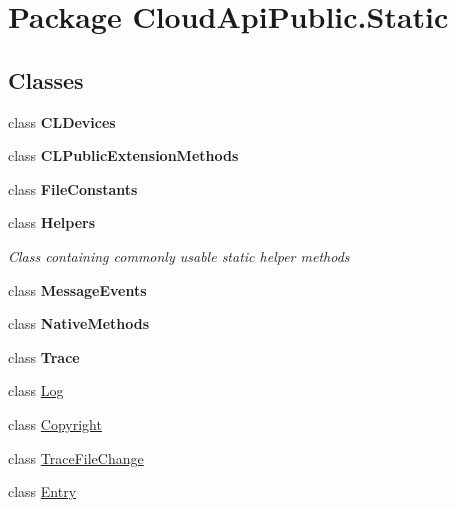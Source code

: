 \hypertarget{namespace_cloud_api_public_1_1_static}{\section{Package Cloud\-Api\-Public.\-Static}
\label{namespace_cloud_api_public_1_1_static}
}
\subsection*{Classes}
\begin{DoxyCompactItemize}
\item 
class {\bfseries C\-L\-Devices}
\item 
class {\bfseries C\-L\-Public\-Extension\-Methods}
\item 
class {\bfseries File\-Constants}
\item 
class {\bfseries Helpers}
\begin{DoxyCompactList}\small\item\em Class containing commonly usable static helper methods \end{DoxyCompactList}\item 
class {\bfseries Message\-Events}
\item 
class {\bfseries Native\-Methods}
\item 
class {\bfseries Trace}
\item 
class \hyperlink{class_cloud_api_public_1_1_static_1_1_log}{Log}
\begin{DoxyCompactList}\small\item\em \end{DoxyCompactList}\item 
class \hyperlink{class_cloud_api_public_1_1_static_1_1_copyright}{Copyright}
\begin{DoxyCompactList}\small\item\em \end{DoxyCompactList}\item 
class \hyperlink{class_cloud_api_public_1_1_static_1_1_trace_file_change}{Trace\-File\-Change}
\begin{DoxyCompactList}\small\item\em \end{DoxyCompactList}\item 
class \hyperlink{class_cloud_api_public_1_1_static_1_1_entry}{Entry}
\begin{DoxyCompactList}\small\item\em \end{DoxyCompactList}\item 

\end{DoxyCompactItemize}
